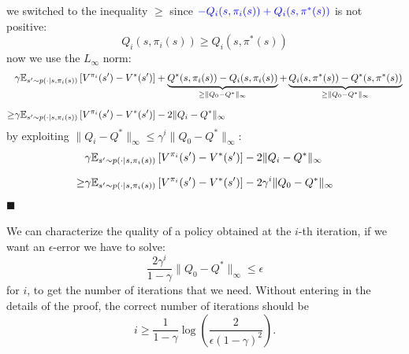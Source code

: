 \documentclass[10pt, a4paper]{report}
\begin{document}
we switched to the inequality $\ge$ since $\color{blue}-Q_i(s,\pi_i(s))+Q_i(s,\pi^*(s))\color{black}$ is not positive:
$$Q_i(s,\pi_i(s))\ge Q_i(s,\pi^*(s))$$
now we use the $L_\infty$ norm:\begin{align}
    &\gamma{\mathbb E}_{s'\sim p(\cdot\mid s,\pi_i(s))}\left[
        V^{\pi_i}(s')-V^*(s')
    \right]+\underbrace{Q^*(s,\pi_i(s))-Q_i(s,\pi_i(s))}_{\ge \|Q_0-Q^*\|_\infty}+\underbrace{Q_i(s,\pi^*(s))
    -Q^*(s,\pi^*(s))}_{\ge \|Q_0-Q^*\|_\infty}\\[1.5ex]
    \ge&\gamma{\mathbb E}_{s'\sim p(\cdot\mid s,\pi_i(s))}\left[
        V^{\pi_i}(s')-V^*(s')
    \right]-2\|Q_i-Q^*\|_\infty\end{align}
    by exploiting $\|Q_i-Q^*\|_\infty\le\gamma^i\|Q_0-Q^*\|_\infty$:
    \begin{align}
        &\gamma{\mathbb E}_{s'\sim p(\cdot\mid s,\pi_i(s))}\left[
        V^{\pi_i}(s')-V^*(s')
    \right]-2\|Q_i-Q^*\|_\infty\\[1.5ex]
    \ge&\gamma{\mathbb E}_{s'\sim p(\cdot\mid s,\pi_i(s))}\left[
        V^{\pi_i}(s')-V^*(s')
    \right]-2\gamma^i\|Q_0-Q^*\|_\infty
    \end{align}
    \hfill$\blacksquare$\bigskip 

We can characterize the quality of a policy obtained at the $i$-th iteration, if we want an $\epsilon$-error we have to solve:\begin{equation}
    \frac{2\gamma^i}{1-\gamma}\|Q_0-Q^*\|_\infty\le\epsilon
\end{equation}
for $i$, to get the number of iterations that we need. Without entering in the details of the proof, the correct number of iterations should be\begin{equation}
    i\ge\frac{1}{1-\gamma}\log\left(\frac{2}{\epsilon(1-\gamma)^2}\right).
\end{equation}
\end{document}
